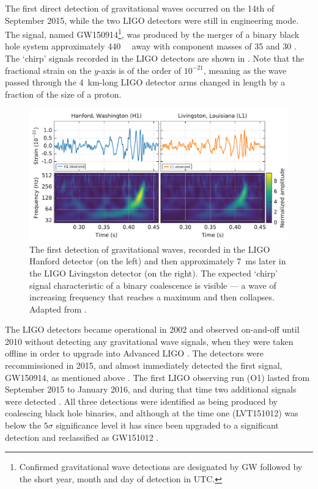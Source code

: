 \begin{colsection}
\begin{colsection}
The first direct detection of gravitational waves occurred on the 14th of September 2015, while the two LIGO detectors were still in engineering mode. The signal, named GW150914\footnote{Confirmed gravitational wave detections are designated by GW followed by the short year, month and day of detection in UTC.}, was produced by the merger of a binary black hole system approximately \SI{440}{\mega\parsec} away with component masses of \SI{35}{\solarmass} and \SI{30}{\solarmass} \citep{GW150914}. The `chirp' signals recorded in the LIGO detectors are shown in . Note that the fractional strain on the $y$-axis is of the order of $10^{-21}$, meaning as the wave passed through the \SI{4}{\kilo\metre}-long LIGO detector arms changed in length by a fraction of the size of a proton.

\newpage

\begin{figure}[t]
    \begin{center}
        \includegraphics[width=\linewidth]{images/chirp2.pdf}
    \end{center}
    \caption[The first detection of gravitational waves]{
        The first detection of gravitational waves, recorded in the LIGO Hanford detector (on the left) and then approximately \SI{7}{\milli\second} later in the LIGO Livingston detector (on the right). The expected `chirp' signal characteristic of a binary coalescence is visible --- a wave of increasing frequency that reaches a maximum and then collapses. Adapted from \citet{GW150914}.
        }\label{fig:chirp}
\end{figure}

The LIGO detectors became operational in 2002 and observed on-and-off until 2010 without detecting any gravitational wave signals, when they were taken offline in order to upgrade into Advanced LIGO \citep{LIGO_initial, LIGO_advanced}. The detectors were recommissioned in 2015, and almost immediately detected the first signal, GW150914, as mentioned above \citep{GW150914}. The first LIGO observing run (O1)  lasted from September 2015 to January 2016, and during that time two additional signals were detected \citep{LIGO_O1}. All three detections were identified as being produced by coalescing black hole binaries, and although at the time one (LVT151012) was below the $5\sigma$ significance level it has since been upgraded to a significant detection and reclassified as GW151012 \citep{GW_catalog}.


\end{colsection}
\end{colsection}
